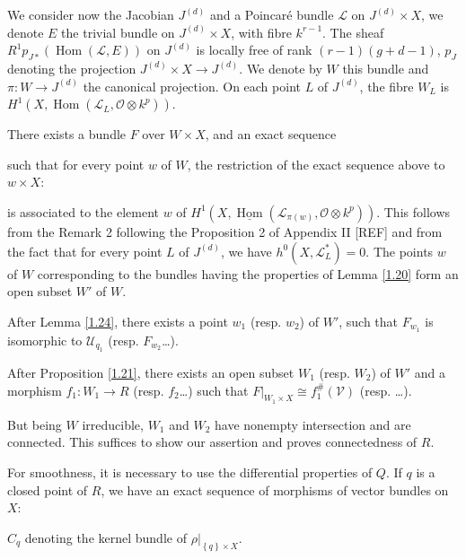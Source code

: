 \documentclass[12pt,a4paper]{book}
\DeclareMathOperator\Hom{Hom}
\def\LL{\mathscr{L}}
\def\OO{\mathscr{O}}
\def\UU{\mathscr{U}}
\theoremstyle{definition} \newtheorem{defn}[thm]{Definition}
\theoremstyle{definition} \newtheorem{ejs}[thm]{Examples}
\theoremstyle{definition} \newtheorem{ej}[thm]{Example}
\begin{document}
     We consider now the Jacobian $J^{(d)}$ and a Poincaré bundle $\LL$ on $J^{(d)}\times X$, we denote $E$ the trivial bundle on $J^{(d)}\times X$, with fibre $k^{r-1}$. The sheaf $R^1p_{J*}(\Hom(\LL,E))$ on $J^{(d)}$ is locally free of rank $(r-1)(g+d-1)$, $p_J$ denoting the projection $J^{(d)}\times X \rightarrow J^{(d)}$. We denote by $W$ this bundle and $\pi:W \rightarrow J^{(d)}$ the canonical projection. On each point $L$ of $J^{(d)}$, the fibre $W_L$ is $H^1(X,\Hom(\LL_L,\OO\otimes k^p))$.

     There exists a bundle $F$ over $W\times X$, and an exact sequence
     \begin{center}
     \end{center}
     such that for every point $w$ of $W$, the restriction of the exact sequence above to $w\times X$:
     \begin{center}
     \end{center}
     is associated to the element $w$ of $H^1(X,\underline{\Hom}(\LL_{\pi(w)},\OO\otimes k^p))$. This follows from the Remark 2 following the Proposition 2 of Appendix II [REF] and from the fact that for every point $L$ of $J^{(d)}$, we have $h^0(X,\LL^*_L)=0$. The points $w$ of $W$ corresponding to the bundles having the properties of Lemma \ref{1.20} form an open subset $W'$ of $W$.

     After Lemma \ref{1.24}, there exists a point $w_1$ (resp. $w_2$) of $W'$, such that $F_{w_1}$ is isomorphic to $\UU_{q_1}$ (resp. $F_{w_2}$\dots).

     After Proposition \ref{1.21}, there exists an open subset $W_1$ (resp. $W_2$) of $W'$ and a morphism $f_1:W_1 \rightarrow R$ (resp. $f_2$\dots) such that $F|_{W_1 \times X}\cong f_1^{\#}(\mathscr{V})$ (resp. \dots).

     But being $W$ irreducible, $W_1$ and $W_2$ have nonempty intersection and are connected. This suffices to show our assertion and proves connectedness of $R$.

     For smoothness, it is necessary to use the differential properties of $Q$. If $q$ is a closed point of $R$, we have an exact sequence of morphisms of vector bundles on $X$:
     \begin{center}
     \end{center}
     $C_q$ denoting the kernel bundle of $\rho|_{ \left\{ q \right\} \times X }$.
\end{document}
